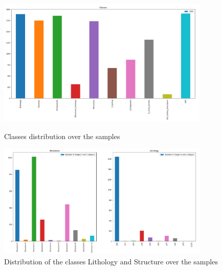 \begin{figure}
    \centering
    \begin{minipage}{0.45\textwidth}
        \centering
        \includegraphics[width=0.9\textwidth]{figures/03-classes.png} %
        \caption{Classes distribution over the samples}\label{fig:classes}
    \end{minipage}\hfill
    \begin{minipage}{0.45\textwidth}
        \centering
        \includegraphics[width=0.9\textwidth]{figures/03-boob.PNG} %
        \caption{Distribution of the classes Lithology and Structure over the samples}\label{fig:litandstruc}
    \end{minipage}
\end{figure}


